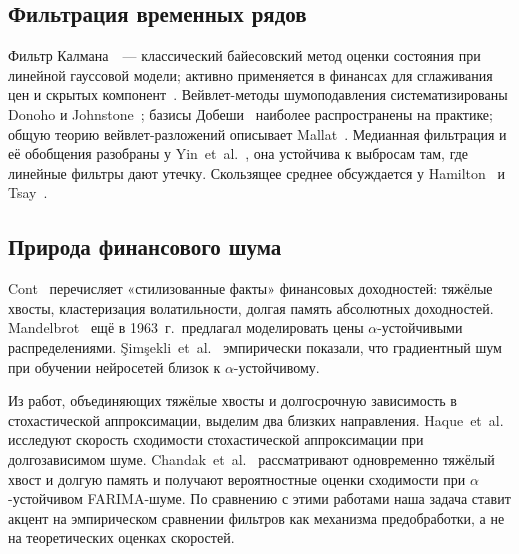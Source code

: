 \documentclass[conference]{IEEEtran}
\begin{document}
\subsection{Фильтрация временных рядов}

Фильтр Калмана~\cite{kalman1960}~--- классический байесовский метод оценки
состояния при линейной гауссовой модели; активно применяется в финансах
для сглаживания цен и скрытых компонент~\cite{harvey1990kalmanfinance}.
Вейвлет-методы шумоподавления систематизированы Donoho и
Johnstone~\cite{donoho1994wavelets}; базисы Добеши~\cite{daubechies1992wavelets}
наиболее распространены на практике; общую теорию вейвлет-разложений
описывает Mallat~\cite{mallat1999wavelet}. Медианная фильтрация и её
обобщения разобраны у Yin~et~al.~\cite{yin1996median}, она устойчива к
выбросам там, где линейные фильтры дают утечку. Скользящее среднее
обсуждается у Hamilton~\cite{hamilton1994timeseries} и
Tsay~\cite{tsay2010financial}.

\subsection{Природа финансового шума}

Cont~\cite{cont2001} перечисляет «стилизованные факты» финансовых
доходностей: тяжёлые хвосты, кластеризация волатильности, долгая память
абсолютных доходностей. Mandelbrot~\cite{mandelbrot1963} ещё в 1963~г.\
предлагал моделировать цены $\alpha$-устойчивыми распределениями.
\c{S}im\c{s}ekli~et~al.~\cite{simsekli2019tailindex} эмпирически показали,
что градиентный шум при обучении нейросетей близок к $\alpha$-устойчивому.


Из работ, объединяющих тяжёлые хвосты и долгосрочную зависимость в
стохастической аппроксимации, выделим два близких направления.
Haque~et~al.~\cite{haque2012lrd} исследуют скорость сходимости
стохастической аппроксимации при долгозависимом шуме.
Chandak~et~al.~\cite{chandak2026hl} рассматривают одновременно тяжёлый
хвост и долгую память и получают вероятностные оценки сходимости при
$\alpha$-устойчивом FARIMA-шуме. По сравнению с этими работами наша
задача ставит акцент на эмпирическом сравнении фильтров как механизма
предобработки, а не на теоретических оценках скоростей.
\end{document}
